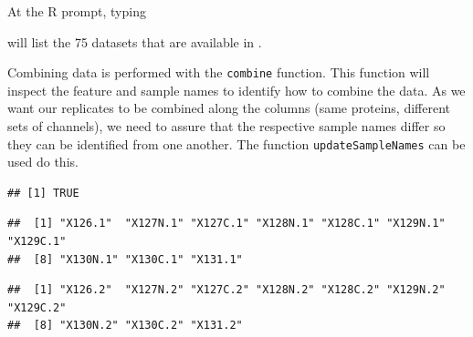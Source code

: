 At the R prompt, typing

\begin{knitrout}
\color{fgcolor}\begin{kframe}
\begin{alltt}
\hlstd{()}
\end{alltt}
\end{kframe}
\end{knitrout}

will list the 75 datasets that are
available in .


Combining data is performed with the \texttt{combine} function. This
function will inspect the feature and sample names to identify how to
combine the data. As we want our replicates to be combined along the
columns (same proteins, different sets of channels), we need to assure
that the respective sample names differ so they can be identified from
one another. The function \texttt{updateSampleNames} can be used do
this.

\begin{knitrout}
\color{fgcolor}\begin{kframe}
\begin{alltt}
\hlstd{(} 
\end{alltt}
\begin{verbatim}
## [1] TRUE
\end{verbatim}
\begin{alltt}
 \hlkwb{<-}  \hlstd{)}
 \hlkwb{<-}  \hlstd{)}
\end{alltt}
\begin{verbatim}
##  [1] "X126.1"  "X127N.1" "X127C.1" "X128N.1" "X128C.1" "X129N.1" "X129C.1"
##  [8] "X130N.1" "X130C.1" "X131.1"
\end{verbatim}
\begin{alltt}
\end{alltt}
\begin{verbatim}
##  [1] "X126.2"  "X127N.2" "X127C.2" "X128N.2" "X128C.2" "X129N.2" "X129C.2"
##  [8] "X130N.2" "X130C.2" "X131.2"
\end{verbatim}
\end{kframe}
\end{knitrout}

